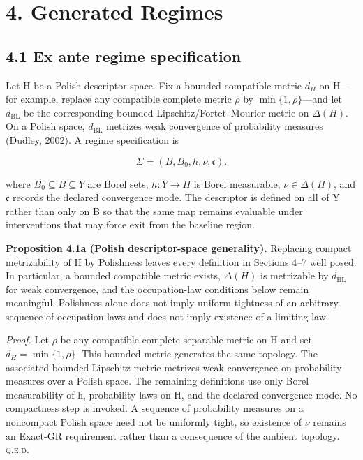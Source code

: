 \documentclass[10pt]{article}
\begin{document}
\section{4. Generated Regimes}\label{generated-regimes}

\subsection{4.1 Ex ante regime
specification}\label{ex-ante-regime-specification}

Let H be a Polish descriptor space. Fix a bounded compatible metric
\(d_H\) on H---for example, replace any compatible complete metric \(\rho\) by
\(\min\{1,\rho\}\)---and let \(d_{\mathrm{BL}}\) be the corresponding
bounded-Lipschitz/Fortet--Mourier metric on \ensuremath{\Delta(H)}. On a Polish space,
\(d_{\mathrm{BL}}\) metrizes weak convergence of probability measures (Dudley, 2002). A
regime specification is

\begin{equation}
\Sigma=(B,B_0,h,\nu,\mathfrak c).
\tag{7}\label{eq:7}
\end{equation}

where \(B_0\subseteq{}B\subseteq{}Y\) are Borel sets, \(h:Y\to{}H\) is
Borel measurable, \(\nu\in{}\Delta(H)\), and \(\mathfrak c\) records the
declared convergence mode. The descriptor is defined on all of Y rather
than only on B so that the same map remains evaluable under
interventions that may force exit from the baseline region.

\textbf{Proposition 4.1a (Polish descriptor-space generality).} Replacing compact metrizability of H by Polishness leaves every definition in Sections 4--7 well posed. In particular, a bounded compatible metric exists, \(\Delta(H)\) is metrizable by \(d_{\mathrm{BL}}\) for weak convergence, and the occupation-law conditions below remain meaningful. Polishness alone does not imply uniform tightness of an arbitrary sequence of occupation laws and does not imply existence of a limiting law.

\emph{Proof.} Let \(\rho\) be any compatible complete separable metric on H and set \(d_H=\min\{1,\rho\}\). This bounded metric generates the same topology. The associated bounded-Lipschitz metric metrizes weak convergence on probability measures over a Polish space. The remaining definitions use only Borel measurability of h, probability laws on H, and the declared convergence mode. No compactness step is invoked. A sequence of probability measures on a noncompact Polish space need not be uniformly tight, so existence of \(\nu\) remains an Exact-GR requirement rather than a consequence of the ambient topology. \hfill\textsc{q.e.d.}
\end{document}
